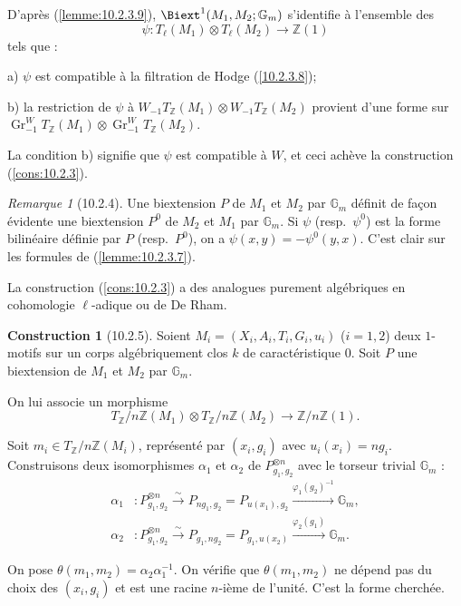 \documentclass[12pt,a4paper]{amsart}
\theoremstyle{plain}
\theoremstyle{definition}
\newtheorem{construction}[lemme]{Construction}
\theoremstyle{remark}
\newtheorem{remarque}[lemme]{Remarque}
\DeclareMathOperator{\Gr}{Gr}
\numberwithin{equation}{section}
\begin{document}
D'après (\ref{lemme:10.2.3.9}), $\Biext^1(M_1,M_2;\mathbb{G}_m)$ s'identifie à l'ensemble des
\[
\psi:T_\ell(M_1)\otimes T_\ell(M_2)\to\mathbb{Z}(1)
\]
tels que :

a) $\psi$ est compatible à la filtration de Hodge (\ref{10.2.3.8});

b) la restriction de $\psi$ à $W_{-1}T_\mathbb{Z}(M_1)\otimes W_{-1}T_\mathbb{Z}(M_2)$ provient d'une forme sur $\Gr_{-1}^WT_\mathbb{Z}(M_1)\otimes\Gr_{-1}^WT_\mathbb{Z}(M_2)$.

La condition b) signifie que $\psi$ est compatible à $W$, et ceci achève la construction (\ref{cons:10.2.3}).

\begin{remarque}[10.2.4]\label{rem:10.2.4}
Une biextension $P$ de $M_1$ et $M_2$ par $\mathbb{G}_m$ définit de façon évidente une biextension $P^0$ de $M_2$ et $M_1$ par $\mathbb{G}_m$. Si $\psi$ (resp.~$\psi^0$) est la forme bilinéaire définie par $P$ (resp.~$P^0$), on a $\psi(x,y)=-\psi^0(y,x)$. C'est clair sur les formules de (\ref{lemme:10.2.3.7}).
\end{remarque}

La construction (\ref{cons:10.2.3}) a des analogues purement algébriques en cohomologie $\ell$-adique ou de De Rham.

\begin{construction}[10.2.5]\label{cons:10.2.5}
Soient $M_i=(X_i,A_i,T_i,G_i,u_i)$ ($i=1,2$) deux $1$-motifs sur un corps algébriquement clos $k$ de caractéristique $0$. Soit $P$ une biextension de $M_1$ et $M_2$ par $\mathbb{G}_m$.

On lui associe un morphisme
\[
T_\mathbb{Z}/n\mathbb{Z}(M_1)\otimes T_\mathbb{Z}/n\mathbb{Z}(M_2)\to\mathbb{Z}/n\mathbb{Z}(1).
\]
\end{construction}

Soit $m_i\in T_\mathbb{Z}/n\mathbb{Z}(M_i)$, représenté par $(x_i,g_i)$ avec $u_i(x_i)=ng_i$. Construisons deux isomorphismes $\alpha_1$ et $\alpha_2$ de $P_{g_1,g_2}^{\otimes n}$ avec le torseur trivial $\mathbb{G}_m$ :
\begin{align*}
\alpha_1 &: P_{g_1,g_2}^{\otimes n} \xrightarrow{\sim} P_{ng_1,g_2} = P_{u(x_1),g_2} \xrightarrow{\varphi_1(g_2)^{-1}} \mathbb{G}_m, \\
\alpha_2 &: P_{g_1,g_2}^{\otimes n} \xrightarrow{\sim} P_{g_1,ng_2} = P_{g_1,u(x_2)} \xrightarrow{\varphi_2(g_1)} \mathbb{G}_m.
\end{align*}

On pose $\theta(m_1,m_2)=\alpha_2\alpha_1^{-1}$. On vérifie que $\theta(m_1,m_2)$ ne dépend pas du choix des $(x_i,g_i)$ et est une racine $n$-ième de l'unité. C'est la forme cherchée.
\end{document}
